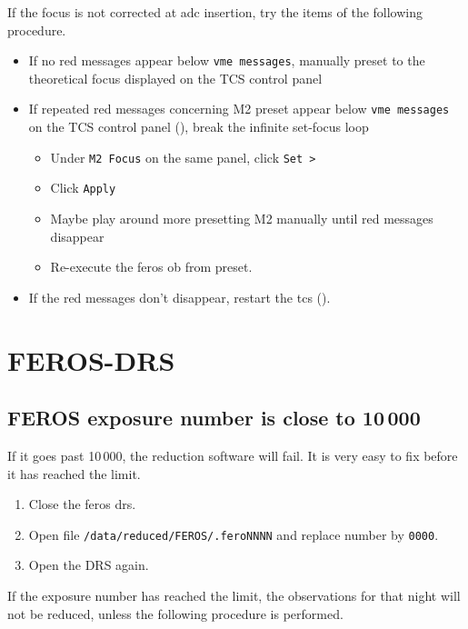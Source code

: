\documentclass[11pt,fleqn,a4paper]{book}
\begin{document}
If the focus is not corrected at \gls{adc} insertion, try the items of the following procedure.

\begin{itemize}
\item If no red messages appear below \texttt{\gls{vme} messages}, manually
preset to the theoretical \gls{focus} displayed on the \gls{TCS control panel}
\item If repeated red messages concerning M2 preset appear below 
 \texttt{\gls{vme} messages} on the
  \gls{TCS control panel} (), break the infinite set-focus loop
  \begin{itemize} 
    \item Under \texttt{M2 Focus} on the same panel, click \texttt{Set >}
    \item Click \texttt{Apply}  
    \item Maybe play around more \gls{preset}ting M2 manually until red messages
        disappear
    \item Re-execute the \gls{feros} \gls{ob} from preset. 
  \end{itemize}
\item If the red messages don't disappear, restart the \gls{tcs} ().
\end{itemize}

 \section{FEROS-DRS}

\subsection{FEROS exposure number is close to 10\,000}

If it goes past 10\,000, the reduction software will fail.  It is very easy to fix before it has reached the limit.
\label{proc:FEROSDRSresetnum}
\begin{enumerate}
    \item Close the \gls{feros} \gls{drs}.
    \item Open file \texttt{/data/reduced/FEROS/.feroNNNN} and replace number by \texttt{0000}.
    \item Open the DRS again.
\end{enumerate}

If the exposure number has reached the limit, the observations for that night will not be reduced, unless the following procedure is performed.
\end{document}
